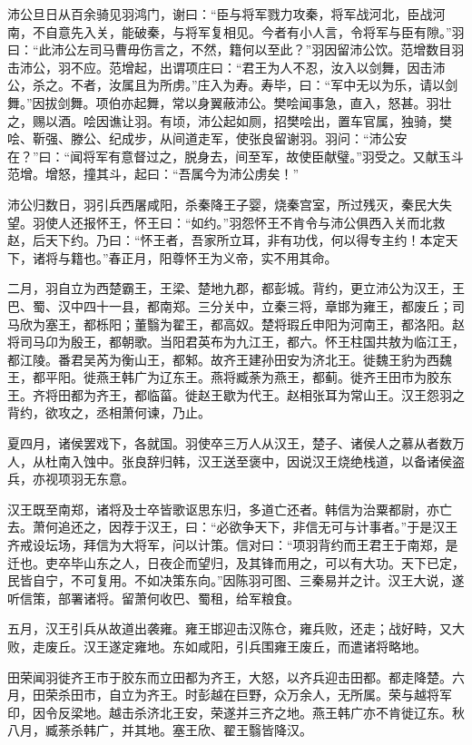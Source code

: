 \documentclass[]{article}
\begin{document}
沛公旦日从百余骑见羽鸿门，谢曰：``臣与将军戮力攻秦，将军战河北，臣战河南，不自意先入关，能破秦，与将军复相见。今者有小人言，令将军与臣有隙。''羽曰：``此沛公左司马曹毋伤言之，不然，籍何以至此？''羽因留沛公饮。范增数目羽击沛公，羽不应。范增起，出谓项庄曰：``君王为人不忍，汝入以剑舞，因击沛公，杀之。不者，汝属且为所虏。''庄入为寿。寿毕，曰：``军中无以为乐，请以剑舞。''因拔剑舞。项伯亦起舞，常以身翼蔽沛公。樊哙闻事急，直入，怒甚。羽壮之，赐以酒。哙因谯让羽。有顷，沛公起如厕，招樊哙出，置车官属，独骑，樊哙、靳强、滕公、纪成步，从间道走军，使张良留谢羽。羽问：``沛公安在？''曰：``闻将军有意督过之，脱身去，间至军，故使臣献璧。''羽受之。又献玉斗范增。增怒，撞其斗，起曰：``吾属今为沛公虏矣！''

沛公归数日，羽引兵西屠咸阳，杀秦降王子婴，烧秦宫室，所过残灭，秦民大失望。羽使人还报怀王，怀王曰：``如约。''羽怨怀王不肯令与沛公俱西入关而北救赵，后天下约。乃曰：``怀王者，吾家所立耳，非有功伐，何以得专主约！本定天下，诸将与籍也。''春正月，阳尊怀王为义帝，实不用其命。

二月，羽自立为西楚霸王，王梁、楚地九郡，都彭城。背约，更立沛公为汉王，王巴、蜀、汉中四十一县，都南郑。三分关中，立秦三将，章邯为雍王，都废丘；司马欣为塞王，都栎阳；董翳为翟王，都高奴。楚将瑕丘申阳为河南王，都洛阳。赵将司马卬为殷王，都朝歌。当阳君英布为九江王，都六。怀王柱国共敖为临江王，都江陵。番君吴芮为衡山王，都邾。故齐王建孙田安为济北王。徙魏王豹为西魏王，都平阳。徙燕王韩广为辽东王。燕将臧荼为燕王，都蓟。徙齐王田市为胶东王。齐将田都为齐王，都临菑。徙赵王歇为代王。赵相张耳为常山王。汉王怨羽之背约，欲攻之，丞相萧何谏，乃止。

夏四月，诸侯罢戏下，各就国。羽使卒三万人从汉王，楚子、诸侯人之慕从者数万人，从杜南入蚀中。张良辞归韩，汉王送至褒中，因说汉王烧绝栈道，以备诸侯盗兵，亦视项羽无东意。

汉王既至南郑，诸将及士卒皆歌讴思东归，多道亡还者。韩信为治粟都尉，亦亡去。萧何追还之，因荐于汉王，曰：``必欲争天下，非信无可与计事者。''于是汉王齐戒设坛场，拜信为大将军，问以计策。信对曰：``项羽背约而王君王于南郑，是迁也。吏卒毕山东之人，日夜企而望归，及其锋而用之，可以有大功。天下已定，民皆自宁，不可复用。不如决策东向。''因陈羽可图、三秦易并之计。汉王大说，遂听信策，部署诸将。留萧何收巴、蜀租，给军粮食。

五月，汉王引兵从故道出袭雍。雍王邯迎击汉陈仓，雍兵败，还走；战好畤，又大败，走废丘。汉王遂定雍地。东如咸阳，引兵围雍王废丘，而遣诸将略地。

田荣闻羽徙齐王市于胶东而立田都为齐王，大怒，以齐兵迎击田都。都走降楚。六月，田荣杀田市，自立为齐王。时彭越在巨野，众万余人，无所属。荣与越将军印，因令反梁地。越击杀济北王安，荣遂并三齐之地。燕王韩广亦不肯徙辽东。秋八月，臧荼杀韩广，并其地。塞王欣、翟王翳皆降汉。
\end{document}
